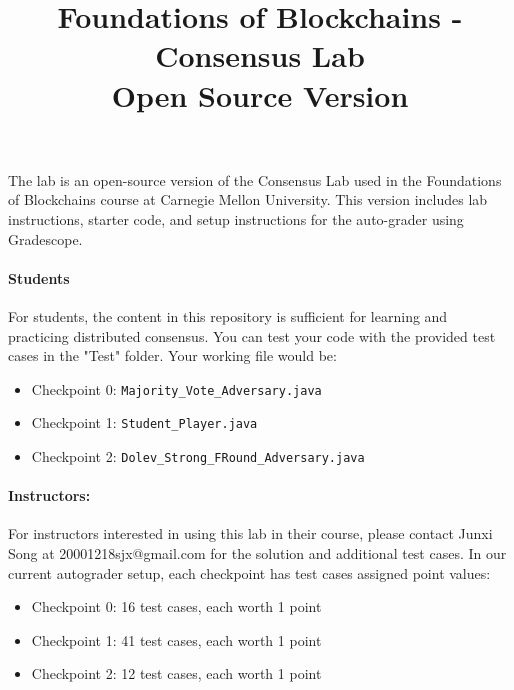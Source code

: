 \documentclass[11pt,letterpaper]{article}
\theoremstyle{definition}
\theoremstyle{boxes}
\begin{document}
%
\title{{\bf Foundations of Blockchains - Consensus Lab}  \\
{\large {\bf Open Source Version}}
}
\author{}
\date{}

\maketitle



The lab is an open-source version of the Consensus Lab used in the Foundations of Blockchains course at Carnegie Mellon University. This version includes lab instructions, starter code, and setup instructions for the auto-grader using Gradescope.

\paragraph{Students} %
For students, the content in this repository is sufficient for learning and practicing distributed consensus. You can test your code with the provided test cases in the "Test" folder. Your working file would be:

\begin{itemize}
    \item
          Checkpoint 0: \texttt{Majority\_Vote\_Adversary.java}
    \item
          Checkpoint 1: \texttt{Student\_Player.java}
    \item
          Checkpoint 2: \texttt{Dolev\_Strong\_FRound\_Adversary.java}
\end{itemize}

\paragraph{Instructors:}For instructors interested in using this lab in their course, please contact Junxi Song at 20001218sjx@gmail.com for the solution and additional test cases. In our current autograder setup, each checkpoint has test cases assigned point values:

\begin{itemize}
    \item
          Checkpoint 0: 16 test cases, each worth 1 point
    \item
          Checkpoint 1: 41 test cases, each worth 1 point
    \item
          Checkpoint 2: 12 test cases, each worth 1 point
\end{itemize}









\end{document}
